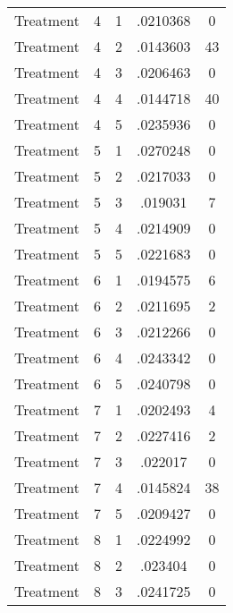 \begin{tabular}{l*{4}{c}}
Treatment           &           4&           1&    .0210368&           0\\
Treatment           &           4&           2&    .0143603&          43\\
Treatment           &           4&           3&    .0206463&           0\\
Treatment           &           4&           4&    .0144718&          40\\
Treatment           &           4&           5&    .0235936&           0\\
Treatment           &           5&           1&    .0270248&           0\\
Treatment           &           5&           2&    .0217033&           0\\
Treatment           &           5&           3&     .019031&           7\\
Treatment           &           5&           4&    .0214909&           0\\
Treatment           &           5&           5&    .0221683&           0\\
Treatment           &           6&           1&    .0194575&           6\\
Treatment           &           6&           2&    .0211695&           2\\
Treatment           &           6&           3&    .0212266&           0\\
Treatment           &           6&           4&    .0243342&           0\\
Treatment           &           6&           5&    .0240798&           0\\
Treatment           &           7&           1&    .0202493&           4\\
Treatment           &           7&           2&    .0227416&           2\\
Treatment           &           7&           3&     .022017&           0\\
Treatment           &           7&           4&    .0145824&          38\\
Treatment           &           7&           5&    .0209427&           0\\
Treatment           &           8&           1&    .0224992&           0\\
Treatment           &           8&           2&     .023404&           0\\
Treatment           &           8&           3&    .0241725&           0\\

\end{tabular}
